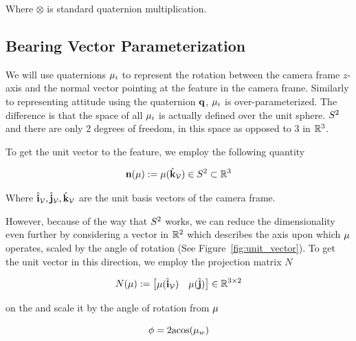 \documentclass[letterpaper, 10 pt, conference]{ieeeconf}  %
\begin{document}
Where $\otimes$ is standard quaternion multiplication.


\subsection{Bearing Vector Parameterization}

We will use quaternions $\mathbf{\mu}_i$ to represent the rotation between the camera frame $z$-axis and the normal vector pointing at the feature in the camera frame.  Similarly to representing attitude using the quaternion $\mathbf{q}$, $\mathbf{\mu}_i$ is over-parameterized.  The difference is that the space of all $\mathbf{\mu}_i$ is actually defined over the unit sphere. $S^2$ and there are only 2 degrees of freedom, in this space as opposed to 3 in $\mathbb{R}^3$.

To get the unit vector to the feature, we employ the following quantity

\begin{equation}
\begin{aligned}
	\mathbf{n}(\mathbf{\mu}) := \mathbf{\mu}(\hat{\mathbf{k}}_{\mathcal{V}}) \in S^2 \subset \mathbb{R}^3
\end{aligned}
\end{equation}

Where $\hat{\mathbf{i}}_{\mathcal{V}}, \hat{\mathbf{j}}_{\mathcal{V}}, \hat{\mathbf{k}}_{\mathcal{V}}$ are the unit basis vectors of the camera frame.

However, because of the way that $S^2$ works, we can reduce the dimensionality even further by considering a vector in $\mathbb{R}^2$ which describes the axis upon which $\mathbf{\mu}$ operates, scaled by the angle of rotation (See Figure~\ref{fig:unit_vector}).  To get the unit vector in this direction, we employ the projection matrix $N$

\begin{equation}
\begin{aligned}
	N(\mathbf{\mu}) := \begin{bmatrix} \mathbf{\mu}(\hat{\mathbf{i}}_{\mathcal{V}}) & \mathbf{\mu}(\hat{\mathbf{j}}) \end{bmatrix} \in \mathbb{R}^{3\times2}
\end{aligned}
\end{equation}

on the and scale it by the angle of rotation from $\mathbf{\mu}$

\begin{equation}
	\phi = 2 \textrm{acos} (\mathbf{\mu}_w)
\end{equation}
\end{document}
